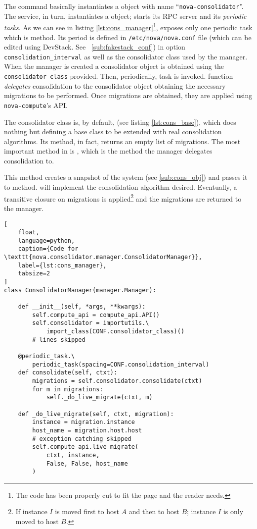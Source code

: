The command basically instantiates a  object with name ``\texttt{nova-consolidator}''. The service, in turn, instantiates a  object; starts its RPC server and its \emph{periodic tasks}. As we can see in listing \ref{lst:cons_manager}\footnote{\label{note:cons_code}The code has been properly cut to fit the page and the reader needs.},  exposes only one periodic task which is  method.
Its period is defined in \texttt{/etc/nova/nova.conf} file (which can be edited using DevStack. See ~\ref{sub:fakestack_conf}) in option \texttt{consolidation\_interval} as well as the consolidator class used by the manager. When the manager is created a consolidator object is obtained using the \texttt{consolidator\_class} provided. Then, periodically,  task is invoked.  function \emph{delegates} consolidation to the consolidator object obtaining the necessary migrations to be performed. Once migrations are obtained, they are applied using \texttt{nova-compute}'s API.

The consolidator class is, by default,  (see listing \ref{lst:cons_base}), which does nothing but defining a base class to be extended with real consolidation algorithms. Its  method, in fact, returns an empty list of migrations. The most important method in  is , which is the method the manager delegates consolidation to.

This method creates a snapshot of the system (see \ref{sub:cons_obj}) and passes it to  method.  will implement the consolidation algorithm desired. Eventually, a transitive closure on migrations is applied\footnote{If instance $I$ is moved first to host $A$ and then to host $B$; instance $I$ is only moved to host $B$.} and the migrations are returned to the manager.

\begin{lstlisting}[
	float,
	language=python,
	caption={Code for \texttt{nova.consolidator.manager.ConsolidatorManager}},
	label={lst:cons_manager},
	tabsize=2
]
class ConsolidatorManager(manager.Manager):

	def __init__(self, *args, **kwargs):
		self.compute_api = compute_api.API()
		self.consolidator = importutils.\
			import_class(CONF.consolidator_class)()
		# lines skipped

	@periodic_task.\
		periodic_task(spacing=CONF.consolidation_interval)
	def consolidate(self, ctxt):
		migrations = self.consolidator.consolidate(ctxt)
		for m in migrations:
			self._do_live_migrate(ctxt, m)

	def _do_live_migrate(self, ctxt, migration):
		instance = migration.instance
		host_name = migration.host.host
		# exception catching skipped
		self.compute_api.live_migrate(
			ctxt, instance,
			False, False, host_name
		)
\end{lstlisting}

